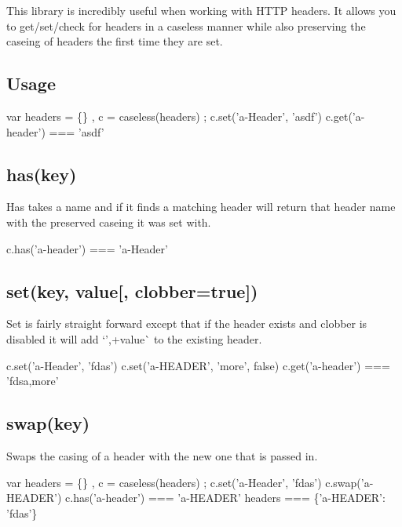 This library is incredibly useful when working with H\+T\+TP headers. It allows you to get/set/check for headers in a caseless manner while also preserving the caseing of headers the first time they are set.

\subsection*{Usage}


\begin{DoxyCode}
var headers = \{\}
  , c = caseless(headers)
  ;
c.set('a-Header', 'asdf')
c.get('a-header') === 'asdf'
\end{DoxyCode}


\subsection*{has(key)}

Has takes a name and if it finds a matching header will return that header name with the preserved caseing it was set with.


\begin{DoxyCode}
c.has('a-header') === 'a-Header'
\end{DoxyCode}


\subsection*{set(key, value\mbox{[}, clobber=true\mbox{]})}

Set is fairly straight forward except that if the header exists and clobber is disabled it will add `',\textquotesingle{}+value\`{} to the existing header.


\begin{DoxyCode}
c.set('a-Header', 'fdas')
c.set('a-HEADER', 'more', false)
c.get('a-header') === 'fdsa,more'
\end{DoxyCode}


\subsection*{swap(key)}

Swaps the casing of a header with the new one that is passed in.


\begin{DoxyCode}
var headers = \{\}
  , c = caseless(headers)
  ;
c.set('a-Header', 'fdas')
c.swap('a-HEADER')
c.has('a-header') === 'a-HEADER'
headers === \{'a-HEADER': 'fdas'\}
\end{DoxyCode}
 